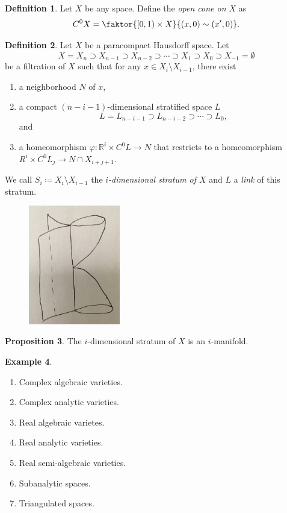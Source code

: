 \documentclass[10pt,letterpaper,cm]{nupset}
\theoremstyle{definition}
\newtheorem{definition}{Definition}[subsection]
\newtheorem{exmp}[definition]{Example}
\theoremstyle{theorem}
\newtheorem{prop}[definition]{Proposition}
\theoremstyle{remark}
\newcommand{\R}{\mathbb{R}}
\newcommand{\1}{\mathbb{1}}
\newcommand{\0}{\vec 0}
\begin{document}
\begin{definition}
Let $X$ be any space. Define the \textit{open cone on $X$} as $$C^0{X} =\faktor{[0,1) \times X}{(x,0) \sim (x',0)} .$$
\end{definition}

\begin{definition}
Let $X$ be a paracompact Hausdorff space. Let $$ X= X_n \supset X_{n-1} \supset X_{n-2} \supset \cdots \supset X_1 \supset X_0 \supset X_{-1} = \emptyset  $$ be a filtration of $X$ such that for any $x\in X_i \setminus X_{i-1}$, there exist 
\begin{enumerate}[label=(\roman*)]
\item a neighborhood $N$ of $x$,
\item a compact $\left(n-i-1\right)$-dimensional stratified space $L$ $$L = L_{n-i-1} \supset  L_{n-i-2} \supset \cdots \supset L_{0},$$ and
\item a homeomorphism $\varphi : \R^i \times C^0{L} \to N$ that restricts to a homeomorphism $R^i \times C^0{L_j}\to N \cap X_{i+j+1}$.  
\end{enumerate}
We call $S_i\coloneqq  X_i \setminus X_{i-1}$ the \textit{$i$-dimensional stratum of $X$} and $L$ a \textit{link} of this stratum. 
\begin{figure}[H]
\centering
\includegraphics[width=40mm]{stratified.jpg}
\end{figure}
\end{definition}


\begin{prop}
The $i$-dimensional stratum of $X$ is an $i$-manifold.
\end{prop}


\begin{exmp} $ $
\begin{enumerate}
\item Complex algebraic varieties.
\item Complex analytic varieties.
\item Real algebraic varietes.
\item Real analytic varieties.
\item Real semi-algebraic varieties.
\item Subanalytic spaces.
\item Triangulated spaces.
\end{enumerate}
\end{exmp}
\end{document}
